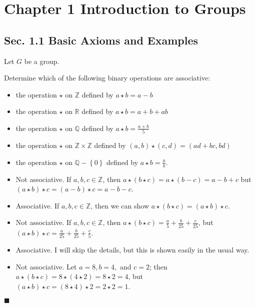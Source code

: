 \documentclass[12pt]{article}
\renewcommand{\qed}{\hfill$\blacksquare$}
\renewenvironment{proof}{\begin{addmargin}[1em]{0em}\begin{newproof}}{\end{newproof}\end{addmargin}\qed}
\newenvironment{problem}[2][Exercise]{\begin{trivlist}
\item[\hskip \labelsep {\bfseries #1}\hskip \labelsep {\bfseries #2.}]}{\end{trivlist}}
\begin{document}
\section*{Chapter 1 Introduction to Groups}

\subsection*{Sec. 1.1 Basic Axioms and Examples}
Let $G$ be a group.

\begin{problem}{1.1.1}
Determine which of the following binary operations are associative:
\begin{itemize}
    \item the operation $\star$ on $\mathbb{Z}$ defined by $a\star b = a-b$
    \item the operation $\star$ on $\mathbb{R}$ defined by $a\star b=a+b+ab$
    \item the operation $\star$ on $\mathbb{Q}$ defined by $a\star b = \frac{a+b}{5}$
    \item the operation $\star$ on $\mathbb{Z}\times \mathbb{Z}$ defined by $\left(a,b\right)\star \left(c,d\right) = \left(ad+bc,bd\right)$
    \item the operation $\star$ on $\mathbb{Q}-\left\{0\right\}$ defined by $a\star b =\frac{a}{b}$.
\end{itemize}
\end{problem}

\begin{proof}
\begin{itemize}
    \item Not associative. If $a,b,c\in \mathbb{Z}$, then $a \star \left(b\star c\right) = a \star \left(b-c\right) = a-b+c$ but $\left(a\star b\right)\star c = \left(a-b\right)\star c = a-b-c$.
    \item Associative. If $a,b,c \in \mathbb{Z}$, then we can show $a \star \left(b\star c\right) = \left(a\star b\right)\star c$.
    \item Not associative. If $a,b,c\in \mathbb{Z}$, then $a\star \left(b\star c\right) = \frac{a}{5} + \frac{b}{25} + \frac{c}{25}$, but $\left(a\star b\right)\star c = \frac{a}{25}+\frac{b}{25}+\frac{c}{5}$.
    \item Associative. I will skip the details, but this is shown easily in the usual way.
    \item Not associative. Let $a=8,b=4,$ and $c=2$; then $a\star \left(b\star c\right) = 8 \star \left(4 \star 2\right) = 8 \star 2 = 4$, but $\left(a\star b\right)\star c = \left(8\star 4\right)\star 2 = 2\star 2 = 1$.
\end{itemize}
\end{proof}
\end{document}
